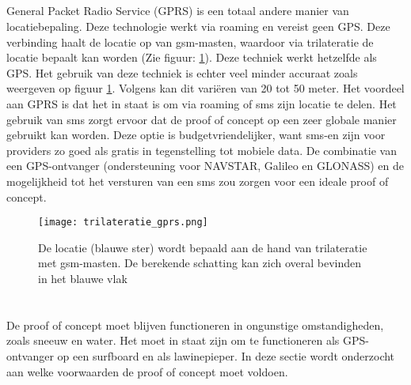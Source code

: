 \subsection{}
General Packet Radio Service (GPRS) is een totaal andere manier van locatiebepaling. Deze technologie werkt via roaming en vereist geen GPS. Deze verbinding haalt de locatie op van gsm-masten, waardoor via trilateratie de locatie bepaalt kan worden (Zie figuur: \ref{fig:trilateratie_gprs}). Deze techniek werkt hetzelfde als GPS.
\newline
Het gebruik van deze techniek is echter veel minder accuraat zoals weergeven op figuur \ref{fig:trilateratie_gprs}. Volgens \cite{gprs} kan dit variëren van 20 tot 50 meter. Het voordeel aan GPRS is dat het in staat is om via roaming of sms zijn locatie te delen. Het gebruik van sms zorgt ervoor dat de proof of concept op een zeer globale manier gebruikt kan worden. Deze optie is budgetvriendelijker, want sms-en zijn voor providers zo goed als gratis in tegenstelling tot mobiele data. De combinatie van een GPS-ontvanger (ondersteuning voor NAVSTAR, Galileo en GLONASS) en de mogelijkheid tot het versturen van een sms zou zorgen voor een ideale proof of concept. 
\begin{figure}
    \texttt{[image: trilateratie\_gprs.png]}
    \caption[Trilateratie bij GPRS]{De locatie (blauwe ster) wordt bepaald aan de hand van trilateratie met gsm-masten. De berekende schatting kan zich overal bevinden in het blauwe vlak}
    \label{fig:trilateratie_gprs}
\end{figure}
\pagebreak
\raggedbottom
\section{}
De proof of concept moet blijven functioneren in ongunstige omstandigheden, zoals sneeuw en water. Het moet in staat zijn om te functioneren als GPS-ontvanger op een surfboard en als lawinepieper. In deze sectie wordt onderzocht aan welke voorwaarden de proof of concept moet voldoen.
